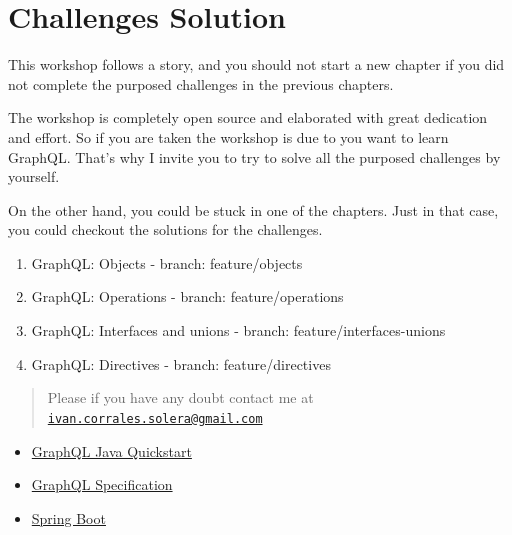 \documentclass[]{book}
\providecommand{\tightlist}{%
  \setlength{\itemsep}{0pt}\setlength{\parskip}{0pt}}
\begin{document}
\chapter{Challenges Solution}\label{challenges-solution}

This workshop follows a story, and you should not start a new chapter if
you did not complete the purposed challenges in the previous chapters.

The workshop is completely open source and elaborated with great
dedication and effort. So if you are taken the workshop is due to you
want to learn GraphQL. That's why I invite you to try to solve all the
purposed challenges by yourself.

On the other hand, you could be stuck in one of the chapters. Just in
that case, you could checkout the solutions for the challenges.

\begin{enumerate}
\def\labelenumi{\arabic{enumi}.}
\setcounter{enumi}{3}
\tightlist
\item
  GraphQL: Objects - branch: feature/objects
\item
  GraphQL: Operations - branch: feature/operations
\item
  GraphQL: Interfaces and unions - branch: feature/interfaces-unions
\item
  GraphQL: Directives - branch: feature/directives
\end{enumerate}

\begin{quote}
Please if you have any doubt contact me at
\href{mailto:ivan.corrales.solera@gmail.com}{\nolinkurl{ivan.corrales.solera@gmail.com}}
\end{quote}

\begin{itemize}
\tightlist
\item
  \href{https://www.graphql-java-kickstart.com}{GraphQL Java Quickstart}
\item
  \href{https://facebook.github.io/graphql/}{GraphQL Specification}
\item
  \href{https://spring.io/projects/spring-boot}{Spring Boot}
\end{itemize}
\end{document}
